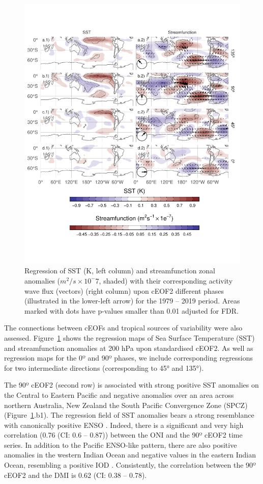 \documentclass[pdflatex,sn-basic]{sn-jnl}
\theoremstyle{thmstyleone}%
\theoremstyle{thmstyletwo}%
\theoremstyle{thmstylethree}%
\begin{document}
\begin{figure}
\includegraphics{../figures/sst-psi-2-1} \caption{Regression of SST (K, left column) and streamfunction zonal anomalies (\(m^2/s\times10^-7\), shaded) with their corresponding activity wave flux (vectors) (right column) upon cEOF2 different phases (illustrated in the lower-left arrow) for the 1979 -- 2019 period. Areas marked with dots have p-values smaller than 0.01 adjusted for FDR.}\label{fig:sst-psi-2}
\end{figure}



The connections between cEOFs and tropical sources of variability were also assessed.
Figure~\ref{fig:sst-psi-2} shows the regression maps of Sea Surface Temperature (SST) and streamfunction anomalies at 200 hPa upon standardised cEOF2.
As well as regression maps for the 0º and 90º phases, we include corresponding regressions for two intermediate directions (corresponding to 45° and 135°).

The 90º cEOF2 (second row) is associated with strong positive SST anomalies on the Central to Eastern Pacific and negative anomalies over an area across northern Australia, New Zealand the South Pacific Convergence Zone (SPCZ) (Figure~\ref{fig:sst-psi-2}.b1).
The regression field of SST anomalies bears a strong resemblance with canonically positive ENSO \citep{bamston1997}.
Indeed, there is a significant and very high correlation (0.76 (CI: 0.6 -- 0.87)) between the ONI and the 90º cEOF2 time series.
In addition to the Pacific ENSO-like pattern, there are also positive anomalies in the western Indian Ocean and negative values in the eastern Indian Ocean, resembling a positive IOD \citep{saji1999}.
Consistently, the correlation between the 90º cEOF2 and the DMI is 0.62 (CI: 0.38 -- 0.78).
\end{document}
